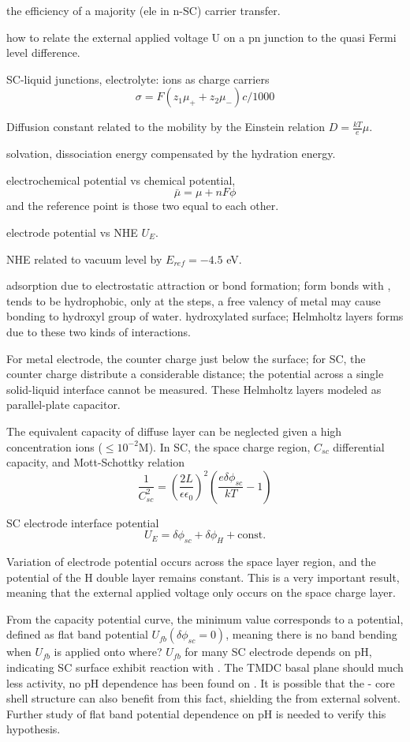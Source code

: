 the efficiency of a majority (ele in n-SC) carrier transfer. 

how to relate the external applied voltage U on a pn junction to the quasi Fermi level difference. 

SC-liquid junctions, 
electrolyte: ions as charge carriers
\[
\sigma = F(z_1\mu_+ + z_2\mu_-)c/1000
\]

Diffusion constant related to the mobility by the Einstein relation $D = \frac{kT}{e} \mu$. 

solvation, dissociation energy compensated by the hydration energy. 

electrochemical potential vs chemical potential, 
\[
\bar{\mu} = \mu + nF\phi
\]
and the reference point is those two equal to each other. 

electrode potential vs NHE $U_E$. 

NHE related to vacuum level by $E_{ref} = -4.5$ eV. 

adsorption due to electrostatic attraction or bond formation;  form bonds with ,  tends to be hydrophobic, only at the steps, a free valency of metal may cause bonding to hydroxyl group of water. hydroxylated surface; Helmholtz layers forms due to these two kinds of interactions. \cite{Memming2000}

For metal electrode, the counter charge just below the surface; for SC, the counter charge distribute a considerable distance; 
the potential across a single solid-liquid interface cannot be measured. These Helmholtz layers modeled as parallel-plate capacitor.

The equivalent capacity of diffuse layer can be neglected given a high concentration ions ($\leq 10^{-2}$M). In SC, the space charge region, $C_{sc}$ differential capacity, and Mott-Schottky relation
\[
\frac{1}{C_{sc}^2} = (\frac{2L}{\epsilon\epsilon_0})^2(\frac{e\delta\phi_{sc}}{kT} - 1)
\]

SC electrode interface potential
\[
U_E = \delta\phi_{sc} + \delta\phi_H + \text{const.}
\]

Variation of electrode potential occurs across the space layer region, and the potential of the H double layer remains constant. This is a very important result, meaning that the external applied voltage only occurs on the space charge layer. 

From the capacity potential curve, the minimum value corresponds to a potential, defined as flat band potential $U_{fb} (\delta\phi_{sc} = 0)$, meaning there is no band bending when $U_{fb}$ is applied onto where? $U_{fb}$ for many SC electrode depends on pH, indicating SC surface exhibit reaction with . The TMDC basal plane should much less activity, no pH dependence has been found on . It is possible that the - core shell structure can also benefit from this fact, shielding the  from external solvent. Further study of flat band potential dependence on pH is needed to verify this hypothesis. 

